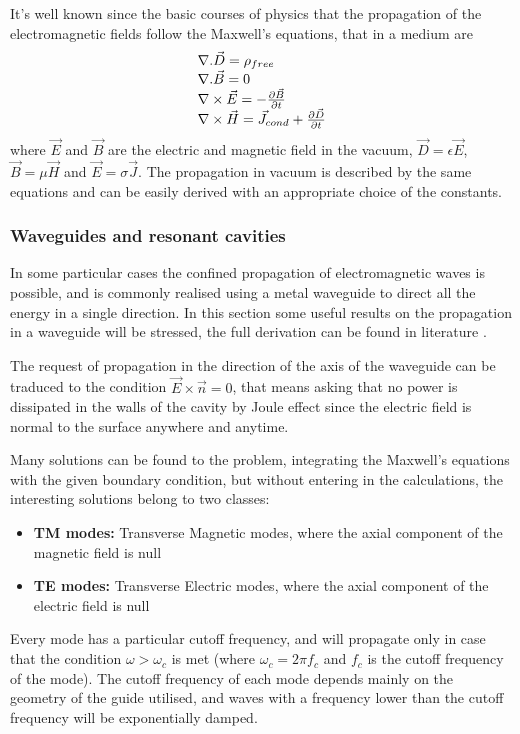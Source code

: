 It's well known since the basic courses of physics that the propagation of the electromagnetic fields follow the Maxwell's equations, that in a medium are
\begin{equation}
\begin{array}{l l l l}
\nabla . \vec{D} = \rho_{free}\\
\nabla . \vec{B} = 0\\
\nabla \times \vec{E} = - \frac{\partial \vec{B}}{\partial t}\\
\nabla \times \vec{H} = \vec{J}_{cond} + \frac{\partial \vec{D}}{\partial t}
\end{array}
\end{equation}
where $\vec{E}$ and $\vec{B}$ are the electric and magnetic field in the vacuum, $\vec{D} = \epsilon \vec{E}$, $\vec{B} = \mu \vec{H}$ and $\vec{E} = \sigma \vec{J}$. The propagation in vacuum is described by the same equations and can be easily derived with an appropriate choice of the constants.

\subsubsection[Waveguides and resonant cavities]{Waveguides and resonant cavities}

In some particular cases the confined propagation of electromagnetic waves is possible, and is commonly realised using a metal waveguide to direct all the energy in a single direction. In this section some useful results on the propagation in a waveguide will be stressed, the full derivation can be found in literature \cite{Botta:EM, Jackson:ClassEM,Weiss:261732}. 

The request of propagation in the direction of the axis of the waveguide can be traduced to the condition $\vec{E} \times \vec{n} = 0$, that means asking that no power is dissipated in the walls of the cavity by Joule effect since the electric field is normal to the surface anywhere and anytime.

Many solutions can be found to the problem, integrating the Maxwell's equations with the given boundary condition, but without entering in the calculations, the interesting solutions belong to two classes:
\begin{itemize}
\item \textbf{TM modes:} Transverse Magnetic modes, where the axial component of the magnetic field is null
\item \textbf{TE modes:} Transverse Electric modes, where the axial component of the electric field is null
\end{itemize}
Every mode has a particular cutoff frequency, and will propagate only in case that the condition $\omega > \omega_c$ is met (where $\omega_c = 2\pi f_c$ and $f_c$ is the cutoff frequency of the mode). The cutoff frequency of each mode depends mainly on the geometry of the guide utilised, and waves with a frequency lower than the cutoff frequency will be exponentially damped.

